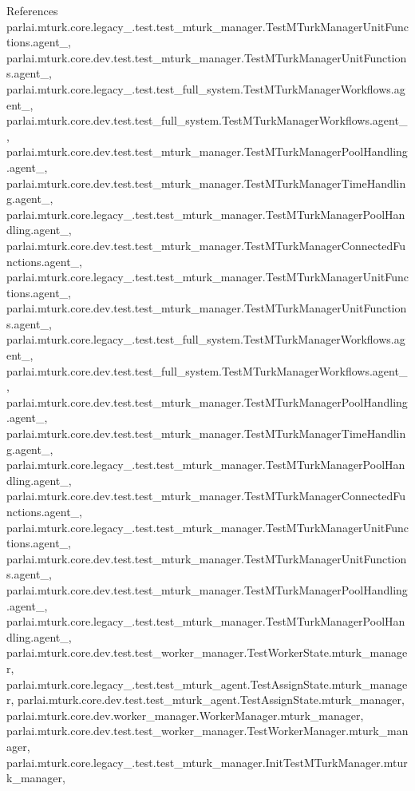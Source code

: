 References parlai.\+mturk.\+core.\+legacy\+\_.\+test.\+test\+\_\+mturk\+\_\+manager.\+Test\+M\+Turk\+Manager\+Unit\+Functions.\+agent\+\_, parlai.\+mturk.\+core.\+dev.\+test.\+test\+\_\+mturk\+\_\+manager.\+Test\+M\+Turk\+Manager\+Unit\+Functions.\+agent\+\_, parlai.\+mturk.\+core.\+legacy\+\_.\+test.\+test\+\_\+full\+\_\+system.\+Test\+M\+Turk\+Manager\+Workflows.\+agent\+\_, parlai.\+mturk.\+core.\+dev.\+test.\+test\+\_\+full\+\_\+system.\+Test\+M\+Turk\+Manager\+Workflows.\+agent\+\_, parlai.\+mturk.\+core.\+dev.\+test.\+test\+\_\+mturk\+\_\+manager.\+Test\+M\+Turk\+Manager\+Pool\+Handling.\+agent\+\_, parlai.\+mturk.\+core.\+dev.\+test.\+test\+\_\+mturk\+\_\+manager.\+Test\+M\+Turk\+Manager\+Time\+Handling.\+agent\+\_, parlai.\+mturk.\+core.\+legacy\+\_.\+test.\+test\+\_\+mturk\+\_\+manager.\+Test\+M\+Turk\+Manager\+Pool\+Handling.\+agent\+\_, parlai.\+mturk.\+core.\+dev.\+test.\+test\+\_\+mturk\+\_\+manager.\+Test\+M\+Turk\+Manager\+Connected\+Functions.\+agent\+\_, parlai.\+mturk.\+core.\+legacy\+\_.\+test.\+test\+\_\+mturk\+\_\+manager.\+Test\+M\+Turk\+Manager\+Unit\+Functions.\+agent\+\_, parlai.\+mturk.\+core.\+dev.\+test.\+test\+\_\+mturk\+\_\+manager.\+Test\+M\+Turk\+Manager\+Unit\+Functions.\+agent\+\_, parlai.\+mturk.\+core.\+legacy\+\_.\+test.\+test\+\_\+full\+\_\+system.\+Test\+M\+Turk\+Manager\+Workflows.\+agent\+\_, parlai.\+mturk.\+core.\+dev.\+test.\+test\+\_\+full\+\_\+system.\+Test\+M\+Turk\+Manager\+Workflows.\+agent\+\_, parlai.\+mturk.\+core.\+dev.\+test.\+test\+\_\+mturk\+\_\+manager.\+Test\+M\+Turk\+Manager\+Pool\+Handling.\+agent\+\_, parlai.\+mturk.\+core.\+dev.\+test.\+test\+\_\+mturk\+\_\+manager.\+Test\+M\+Turk\+Manager\+Time\+Handling.\+agent\+\_, parlai.\+mturk.\+core.\+legacy\+\_.\+test.\+test\+\_\+mturk\+\_\+manager.\+Test\+M\+Turk\+Manager\+Pool\+Handling.\+agent\+\_, parlai.\+mturk.\+core.\+dev.\+test.\+test\+\_\+mturk\+\_\+manager.\+Test\+M\+Turk\+Manager\+Connected\+Functions.\+agent\+\_, parlai.\+mturk.\+core.\+legacy\+\_.\+test.\+test\+\_\+mturk\+\_\+manager.\+Test\+M\+Turk\+Manager\+Unit\+Functions.\+agent\+\_, parlai.\+mturk.\+core.\+dev.\+test.\+test\+\_\+mturk\+\_\+manager.\+Test\+M\+Turk\+Manager\+Unit\+Functions.\+agent\+\_, parlai.\+mturk.\+core.\+dev.\+test.\+test\+\_\+mturk\+\_\+manager.\+Test\+M\+Turk\+Manager\+Pool\+Handling.\+agent\+\_, parlai.\+mturk.\+core.\+legacy\+\_.\+test.\+test\+\_\+mturk\+\_\+manager.\+Test\+M\+Turk\+Manager\+Pool\+Handling.\+agent\+\_, parlai.\+mturk.\+core.\+dev.\+test.\+test\+\_\+worker\+\_\+manager.\+Test\+Worker\+State.\+mturk\+\_\+manager, parlai.\+mturk.\+core.\+legacy\+\_.\+test.\+test\+\_\+mturk\+\_\+agent.\+Test\+Assign\+State.\+mturk\+\_\+manager, parlai.\+mturk.\+core.\+dev.\+test.\+test\+\_\+mturk\+\_\+agent.\+Test\+Assign\+State.\+mturk\+\_\+manager, parlai.\+mturk.\+core.\+dev.\+worker\+\_\+manager.\+Worker\+Manager.\+mturk\+\_\+manager, parlai.\+mturk.\+core.\+dev.\+test.\+test\+\_\+worker\+\_\+manager.\+Test\+Worker\+Manager.\+mturk\+\_\+manager, parlai.\+mturk.\+core.\+legacy\+\_.\+test.\+test\+\_\+mturk\+\_\+manager.\+Init\+Test\+M\+Turk\+Manager.\+mturk\+\_\+manager, 
